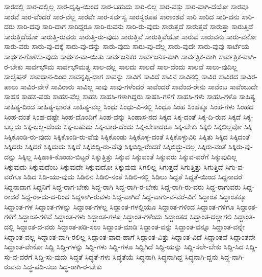 {ಸಾರದಲ್ಲಿ
ಸಾರ-ದಲ್ಲಿಲ್ಲ
ಸಾರ-ದೃಷ್ಟಿ-ಯಿಂದ
ಸಾರ-ಬಹುದು
ಸಾರ-ಲಿಲ್ಲ
ಸಾರ-ವಸ್ತು
ಸಾರ-ವಾಗಿ-ದೆಯೋ
ಸಾರವೂ
ಸಾರವೆ
ಸಾರ-ವೆಂದರೆ
ಸಾರ-ವೆಲ್ಲ
ಸಾರವೇ
ಸಾರ-ಸರ್ವಸ್ವ
ಸಾರಸ್ವರೂಪ
ಸಾರಾಂಶವೆ
ಸಾರಿ
ಸಾರಿದ
ಸಾರಿ-ದನು
ಸಾರಿ-ದರು
ಸಾರಿ-ದವು
ಸಾರಿ-ದಾಗ
ಸಾರಿದ್ದರೂ
ಸಾರಿ-ರುವನು
ಸಾರಿ-ರು-ವುದು
ಸಾರುತ್ತದೆ
ಸಾರುತ್ತವೆ
ಸಾರುತ್ತಾ
ಸಾರುತ್ತಿದೆ
ಸಾರುತ್ತಿದೆಯೋ
ಸಾರುತ್ತಿ-ರುವರು
ಸಾರುತ್ತಿ-ರು-ವುದು
ಸಾರುತ್ತಿವೆ
ಸಾರುತ್ತಿವೆಯೋ
ಸಾರುವ
ಸಾರುವನು
ಸಾರು-ವನೋ
ಸಾರು-ವರು
ಸಾರು-ವು-ದಕ್ಕೆ
ಸಾರು-ವು-ದನ್ನು
ಸಾರು-ವುದು
ಸಾರು-ವು-ದೆಲ್ಲ
ಸಾರು-ವುದೇ
ಸಾರು-ವುವು
ಸಾರ್ಟೆಯ
ಸಾರ್ಥಕ-ಗೊಳಿಸು-ವುದು
ಸಾರ್ಥಕ-ವಾ-ಯಿತು
ಸಾರ್ವಜನಿಕರ
ಸಾರ್ವಜನಿಕ-ವಾಗಿ
ಸಾರ್ವತ್ರಿಕ-ವಾಗಿ
ಸಾರ್ವತ್ರಿಕ-ವಾಗಿ-ರ-ಬೇಕು
ಸಾರ್ವಭೌಮ
ಸಾರ್ವಭೌಮತ್ವ
ಸಾಲ-ದಲ್ಲ
ಸಾಲದು
ಸಾಲದೆ
ಸಾಲ-ದೆಂದು
ಸಾಲವೆ
ಸಾಲು-ವುದಿಲ್ಲ
ಸಾಲ್ವೆಷನ್
ಸಾವಧಾನ-ದಿಂದ
ಸಾವನ್ನಪ್ಪಿ-ದಾಗ
ಸಾವನ್ನು
ಸಾವಿಗೆ
ಸಾವಿದೆ
ಸಾವಿನ
ಸಾವಿನಲ್ಲಿ
ಸಾವಿರ
ಸಾವಿರದ
ಸಾವಿರ-ಪಾಲು
ಸಾವಿರ-ವೇಳೆ
ಸಾವಿರಾರು
ಸಾವಿಲ್ಲ
ಸಾವು
ಸಾವು-ಗಳೆಂದರೆ
ಸಾವೆಂದರೆ
ಸಾವೆಂದ-ರೇನು
ಸಾವೆಂಬ
ಸಾವೆಂಬುದೇ
ಸಾಹಸ
ಸಾಹಸ-ಪಡು
ಸಾಹಸ-ವೆಲ್ಲ
ಸಾಹಸಿ
ಸಾಹಸಿ-ಗಳಾಗಿದ್ದರು
ಸಾಹಸಿ-ಗಳಿಗೆ
ಸಾಹಸಿ-ಗಳು
ಸಾಹಸಿ-ಗಳೊ
ಸಾಹಿತ್ಯ
ಸಾಹಿತ್ಯ-ದಿಂದ
ಸಾಹಿತ್ಯ-ಭಾರತ
ಸಾಹಿತ್ಯ-ವಲ್ಲ
ಸಿಂಧು
ಸಿಂಧು-ವಿ-ನಲ್ಲಿ
ಸಿಂಧೂ
ಸಿಂಹ
ಸಿಂಹಕ್ಕೂ
ಸಿಂಹ-ಗಳು
ಸಿಂಹದ
ಸಿಂಹ-ದಂತೆ
ಸಿಂಹ-ದಷ್ಟೇ
ಸಿಂಹ-ದೊಂದಿಗೆ
ಸಿಂಹ-ವನ್ನು
ಸಿಂಹಾಸ-ನದ
ಸಿಕ್ಕದ
ಸಿಕ್ಕ-ದಂತೆ
ಸಿಕ್ಕ-ದಿ-ರುವ
ಸಿಕ್ಕದೆ
ಸಿಕ್ಕ-ಬಲ್ಲದು
ಸಿಕ್ಕ-ಬಲ್ಲ-ದೆಂದು
ಸಿಕ್ಕ-ಬಹುದು
ಸಿಕ್ಕ-ಬಾರ-ದೆಂದು
ಸಿಕ್ಕ-ಬೇಕಾದರೂ
ಸಿಕ್ಕ-ಬೇಕು
ಸಿಕ್ಕಲಿ
ಸಿಕ್ಕಲಿಲ್ಲವೋ
ಸಿಕ್ಕಿ
ಸಿಕ್ಕಿಕೊಂಡಿ-ರು-ವುದು
ಸಿಕ್ಕಿಕೊಂಡಿ-ರು-ವೆವು
ಸಿಕ್ಕಿಕೊಂಡು
ಸಿಕ್ಕಿಕೊಳ್ಳ-ದಂತೆ
ಸಿಕ್ಕಿಕೊಳ್ಳುವಿರಿ
ಸಿಕ್ಕಿತು
ಸಿಕ್ಕಿದ
ಸಿಕ್ಕಿದಂತೆ
ಸಿಕ್ಕಿದರು
ಸಿಕ್ಕಿದರೆ
ಸಿಕ್ಕಿದುದು
ಸಿಕ್ಕಿದೆ
ಸಿಕ್ಕಿಬಿದ್ದಿ-ರು-ವೆವು
ಸಿಕ್ಕಿಬಿದ್ದಿ-ರೆಂದರೆ
ಸಿಕ್ಕಿಬಿದ್ದು-ದಲ್ಲ
ಸಿಕ್ಕಿರು-ವಂತೆ
ಸಿಕ್ಕಿರು-ವು-ದನ್ನು
ಸಿಕ್ಕಿಲ್ಲ
ಸಿಕ್ಕಿಹಾಕಿ-ಕೊಂಡು-ಬಿಟ್ಟರೆ
ಸಿಕ್ಕುತ್ತಿತ್ತು
ಸಿಕ್ಕುವ
ಸಿಕ್ಕುವಂತೆ
ಸಿಕ್ಕುವರು
ಸಿಕ್ಕುವ-ವರೆಗೆ
ಸಿಕ್ಕುವುದಿಲ್ಲ
ಸಿಕ್ಕುವುದು
ಸಿಕ್ಕುವುದೆಂಬ
ಸಿಕ್ಕುವುದೇ
ಸಿಕ್ಕುವುದೋ
ಸಿಕ್ಕುವುವು
ಸಿಗಲಿಲ್ಲ
ಸಿಗುತ್ತದೆ
ಸಿಗುತ್ತಿತ್ತು
ಸಿಗುತ್ತಿದೆ
ಸಿಗು-ವ-ವರೆಗೂ
ಸಿಡಿದ
ಸಿಡಿ-ಯು-ವುದು
ಸಿಡಿಲಿನ
ಸಿಡಿಲಿ-ನಂತೆ
ಸಿಡಿಲಿ-ನಲ್ಲಿ
ಸಿಡಿಲು
ಸಿದ್ದತೆ
ಸಿದ್ದತೆ-ಯಿಂದ
ಸಿದ್ದನಾದರೆ
ಸಿದ್ದನಾದಾಗ
ಸಿದ್ದನಿಗೆ
ಸಿದ್ದ-ರಾಗ-ಬೇಕು
ಸಿದ್ದ-ರಾಗಿ
ಸಿದ್ದ-ರಾಗಿ-ರ-ಬೇಕು
ಸಿದ್ದ-ರಾಗಿ-ರು-ವರು
ಸಿದ್ದ-ರಾಗುವರು
ಸಿದ್ದ-ರಾದರೆ
ಸಿದ್ದ-ರಾ-ದು-ದ-ರಿಂದ
ಸಿದ್ದಳಾಗಿ-ರುವಳು
ಸಿದ್ದ-ವಾಗಿದೆ
ಸಿದ್ದ-ವಾಗು-ವ-ವರೆ-ವಿಗೆ
ಸಿದ್ದಾಂತ
ಸಿದ್ದಾಂತಕ್ಕೂ
ಸಿದ್ದಾಂತ-ಗಳ
ಸಿದ್ದಾಂತ-ಗಳನ್ನು
ಸಿದ್ದಾಂತ-ಗಳಲ್ಲ
ಸಿದ್ದಾಂತ-ಗಳಲ್ಲಿಯೂ
ಸಿದ್ದಾಂತ-ಗಳಿಂದ
ಸಿದ್ದಾಂತ-ಗಳಿಗೂ
ಸಿದ್ದಾಂತ-ಗಳಿಗೆ
ಸಿದ್ದಾಂತ-ಗಳಿವೆ
ಸಿದ್ದಾಂತ-ಗಳು
ಸಿದ್ದಾಂತ-ಗಳೂ
ಸಿದ್ದಾಂತ-ಗಳೆಂದು
ಸಿದ್ದಾಂತದ
ಸಿದ್ದಾಂತ-ದಲ್ಲಾಗಲಿ
ಸಿದ್ದಾಂತ-ದಲ್ಲಿ
ಸಿದ್ದಾಂತ-ದ-ವರು
ಸಿದ್ದಾಂತ-ಪಡಿ-ಸಲು
ಸಿದ್ದಾಂತ-ಮಾಡಿ
ಸಿದ್ದಾಂತ-ವನ್ನು
ಸಿದ್ದಾಂತ-ವನ್ನೂ
ಸಿದ್ದಾಂತ-ವನ್ನೇ
ಸಿದ್ದಾಂತ-ವಲ್ಲ
ಸಿದ್ದಾಂತ-ವಾಗಿ-ರಲಿಲ್ಲ
ಸಿದ್ದಾಂತ-ವಾದ-ಹಾಗೆ
ಸಿದ್ದಾಂತ-ವಿತ್ತು
ಸಿದ್ದಾಂತ-ವಿದೆ
ಸಿದ್ದಾಂತವೆ
ಸಿದ್ದಾಂತವೇ
ಸಿದ್ದಾಂತ-ವೇನೋ
ಸಿದ್ದಿ
ಸಿದ್ದಿ-ಗಳನ್ನು
ಸಿದ್ದಿ-ಗಳು
ಸಿದ್ದಿ-ಗಳೂ
ಸಿದ್ದಿಗಿದೆ
ಸಿದ್ದಿ-ಯನ್ನು
ಸಿದ್ದಿ-ಸಲೇ-ಬೇಕು
ಸಿದ್ದಿ-ಸಿದ
ಸಿದ್ದಿ-ಸು-ವ-ವರೆಗೆ
ಸಿದ್ದಿ-ಸು-ವುದು
ಸಿದ್ಧತೆ
ಸಿದ್ಧತೆ-ಗಳು
ಸಿದ್ಧತೆಯೆ
ಸಿದ್ಧನಾಗಿ
ಸಿದ್ಧನಾಗಿದ್ದ
ಸಿದ್ಧನಾಗಿ-ದ್ದನು
ಸಿದ್ಧ-ನಾಗಿ-ರುವನು
ಸಿದ್ಧ-ಪಡಿ-ಸಲು
ಸಿದ್ಧ-ರಾಗಿ-ರ-ಬೇಕು
}
